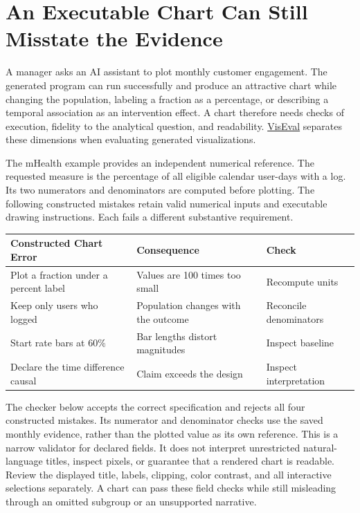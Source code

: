 \hypertarget{M08-an-executable-chart-can-still-misstate-the-evidence}{%
\section{An Executable Chart Can Still Misstate the
Evidence}\label{M08-an-executable-chart-can-still-misstate-the-evidence}}

\noindent A manager asks an AI assistant to plot monthly customer engagement. The
generated program can run successfully and produce an attractive chart
while changing the population, labeling a fraction as a percentage, or
describing a temporal association as an intervention effect. A chart
therefore needs checks of execution, fidelity to the analytical
question, and readability.
\href{https://github.com/microsoft/VisEval}{VisEval} separates these
dimensions when evaluating generated visualizations.

The mHealth example provides an independent numerical reference. The
requested measure is the percentage of all eligible calendar user-days
with a log. Its two numerators and denominators are computed before
plotting. The following constructed mistakes retain valid numerical
inputs and executable drawing instructions. Each fails a different
substantive requirement.

\begin{table}[H]
\centering\small
\begin{tabular}{@{}
  >{\raggedright\arraybackslash}p{}
  >{\raggedright\arraybackslash}p{}
  >{\raggedright\arraybackslash}p{}@{}}
\toprule
Constructed Chart Error & Consequence & Check \\
\midrule

Plot a fraction under a percent label & Values are 100 times too small &
Recompute units \\
Keep only users who logged & Population changes with the outcome &
Reconcile denominators \\
Start rate bars at 60\% & Bar lengths distort magnitudes & Inspect
baseline \\
Declare the time difference causal & Claim exceeds the design & Inspect
interpretation \\
\bottomrule
\end{tabular}
\end{table}

The checker below accepts the correct specification and rejects all four
constructed mistakes. Its numerator and denominator checks use the saved
monthly evidence, rather than the plotted value as its own reference.
This is a narrow validator for declared fields. It does not interpret
unrestricted natural-language titles, inspect pixels, or guarantee that
a rendered chart is readable. Review the displayed title, labels,
clipping, color contrast, and all interactive selections separately. A
chart can pass these field checks while still misleading through an
omitted subgroup or an unsupported narrative.

